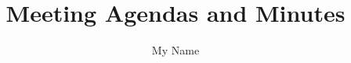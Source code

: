 \documentclass[9pt]{article}
\begin{document}
\thispagestyle{empty}

\title{Meeting Agendas and Minutes}
\author{My Name}
\maketitle
\medskip

\tableofcontents
\thispagestyle{empty}

\clearpage


\end{document}
